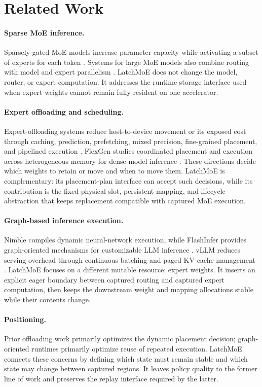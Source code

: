 \section{Related Work}
\label{sec:related}

\paragraph{Sparse MoE inference.}
Sparsely gated MoE models increase parameter capacity while activating a
subset of experts for each token
\cite{shazeer2017outrageously,fedus2022switch,du2022glam,rajbhandari2022deepspeedmoe}.
Systems for large MoE models also combine routing with model and expert
parallelism \cite{rajbhandari2022deepspeedmoe,li2023lina}. LatchMoE does not
change the model, router, or expert computation. It addresses the runtime
storage interface used when expert weights cannot remain fully resident on one
accelerator.

\paragraph{Expert offloading and scheduling.}
Expert-offloading systems reduce host-to-device movement or its exposed cost
through caching, prediction, prefetching, mixed precision, fine-grained
placement, and pipelined execution
\cite{hwang2024pregated,xue2024moeinfinity,kong2024swapmoe,song2024promoe,tang2024hobbit,cao2025moelightning,fang2025klotski,li2026commitmoe}.
FlexGen studies coordinated placement and execution across heterogeneous
memory for dense-model inference \cite{flexgen}. These directions decide which
weights to retain or move and when to move them. LatchMoE is complementary: its
placement-plan interface can accept such decisions, while its contribution is
the fixed physical slot, persistent mapping, and lifecycle abstraction that
keeps replacement compatible with captured MoE execution.

\paragraph{Graph-based inference execution.}
Nimble compiles dynamic neural-network execution, while
FlashInfer provides graph-oriented mechanisms for customizable LLM inference
\cite{kwon2020nimble,ye2025flashinfer}. vLLM reduces serving overhead through
continuous batching and paged KV-cache management \cite{vllm}. LatchMoE
focuses on a different mutable resource: expert weights. It inserts an explicit
eager boundary between captured routing and captured expert computation, then
keeps the downstream weight and mapping allocations stable while their
contents change.

\paragraph{Positioning.}
Prior offloading work primarily optimizes the dynamic placement decision;
graph-oriented runtimes primarily optimize reuse of repeated execution.
LatchMoE connects these concerns by defining which state must remain stable and
which state may change between captured regions. It leaves policy quality to
the former line of work and preserves the replay interface required by the
latter.
